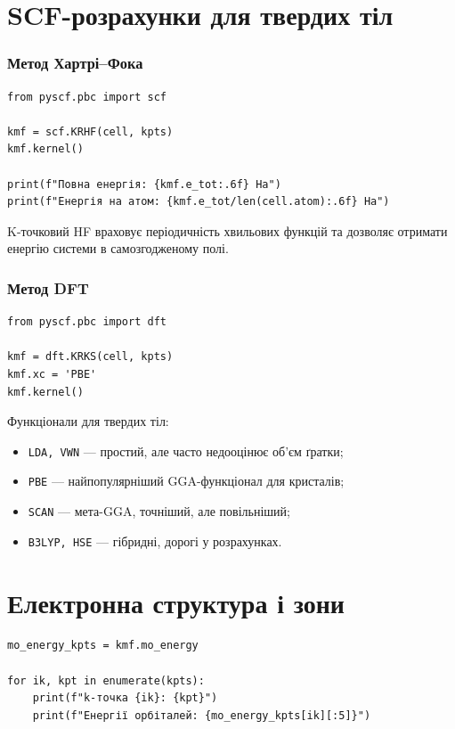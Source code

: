 \section{SCF-розрахунки для твердих тіл}

\subsubsection{Метод Хартрі–Фока}

\begin{verbatim}
from pyscf.pbc import scf

kmf = scf.KRHF(cell, kpts)
kmf.kernel()

print(f"Повна енергія: {kmf.e_tot:.6f} Ha")
print(f"Енергія на атом: {kmf.e_tot/len(cell.atom):.6f} Ha")
\end{verbatim}

K-точковий HF враховує періодичність хвильових функцій та дозволяє отримати енергію системи в самозгодженому полі.

\subsubsection{Метод DFT}

\begin{verbatim}
from pyscf.pbc import dft

kmf = dft.KRKS(cell, kpts)
kmf.xc = 'PBE'
kmf.kernel()
\end{verbatim}

Функціонали для твердих тіл:
\begin{itemize}
    \item \texttt{LDA, VWN} --- простий, але часто недооцінює об’єм ґратки;
    \item \texttt{PBE} --- найпопулярніший GGA-функціонал для кристалів;
    \item \texttt{SCAN} --- мета-GGA, точніший, але повільніший;
    \item \texttt{B3LYP, HSE} --- гібридні, дорогі у розрахунках.
\end{itemize}

\section{Електронна структура і зони}

\begin{verbatim}
mo_energy_kpts = kmf.mo_energy

for ik, kpt in enumerate(kpts):
    print(f"k-точка {ik}: {kpt}")
    print(f"Енергії орбіталей: {mo_energy_kpts[ik][:5]}")
\end{verbatim}

